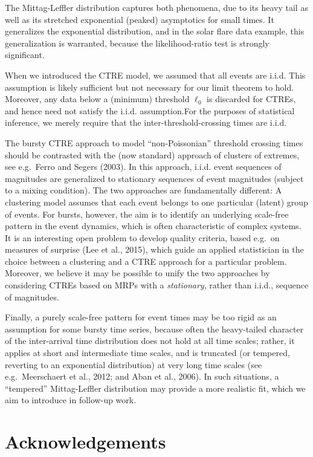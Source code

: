 \documentclass[]{elsarticle} %
\begin{document}
The Mittag-Leffler distribution captures both phenomena, due to its
heavy tail as well as its stretched exponential (peaked) asymptotics for
small times. It generalizes the exponential distribution, and in the
solar flare data example, this generalization is warranted, because the
likelihood-ratio test is strongly significant.

When we introduced the CTRE model, we assumed that all events are i.i.d.
This assumption is likely sufficient but not necessary for our limit
theorem to hold. Moreover, any data below a (minimum) threshold
\(\ell_0\) is discarded for CTREs, and hence need not satisfy the i.i.d.
assumption.For the purposes of statistical inference, we merely require
that the inter-threshold-crossing times are i.i.d.

The bursty CTRE approach to model ``non-Poissonian'' threshold crossing
times should be contrasted with the (now standard) approach of clusters
of extremes, see e.g.~Ferro and Segers (2003). In this approach, i.i.d.
event sequences of magnitudes are generalized to stationary sequences of
event magnitudes (subject to a mixing condition). The two approaches are
fundamentally different: A clustering model assumes that each event
belongs to one particular (latent) group of events. For bursts, however,
the aim is to identify an underlying scale-free pattern in the event
dynamics, which is often characteristic of complex systems. It is an
interesting open problem to develop quality criteria, based e.g.~on
measures of surprise (Lee et al., 2015), which guide an applied
statistician in the choice between a clustering and a CTRE approach for
a particular problem. Moreover, we believe it may be possible to unify
the two approaches by considering CTREs based on MRPs with a
\emph{stationary}, rather than i.i.d., sequence of magnitudes.

Finally, a purely scale-free pattern for event times may be too rigid as
an assumption for some bursty time series, because often the
heavy-tailed character of the inter-arrival time distribution does not
hold at all time scales; rather, it applies at short and intermediate
time scales, and is truncated (or tempered, reverting to an exponential
distribution) at very long time scales (see e.g.~Meerschaert et al.,
2012; and Aban et al., 2006). In such situations, a ``tempered''
Mittag-Leffler distribution may provide a more realistic fit, which we
aim to introduce in follow-up work.

\hypertarget{acknowledgements}{%
\section*{Acknowledgements}\label{acknowledgements}}
\end{document}
